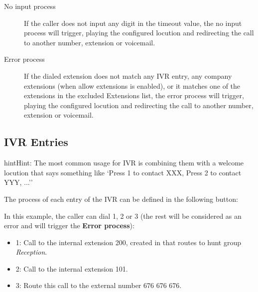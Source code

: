 \documentclass[letterpaper,10pt,english]{sphinxmanual}
\begin{document}
\begin{description}
\item[{No input process}] \leavevmode{}\label{company/ivrs:term-no-input-process}
If the caller does not input any digit in the timeout value, the
no input process will trigger, playing the configured locution and
redirecting the call to another number, extension or voicemail.

\item[{Error process}] \leavevmode{}\label{company/ivrs:term-error-process}
If the dialed extension does not match any IVR entry, any company extensions
(when allow extensions is enabled), or it matches one of the extensions in the
excluded Extensions list, the error process will trigger, playing the configured
locution and redirecting the call to another number, extension or voicemail.

\end{description}


\subsection{IVR Entries}
\label{company/ivrs:ivr-entries}
\begin{notice}{hint}{Hint:}
The most common usage for IVR is combining them with a welcome
locution that says something like `Press 1 to contact XXX, Press 2 to
contact YYY, ...''
\end{notice}

The process of each entry of the IVR can be defined in the following button:

\noindent{}

In this example, the caller can dial 1, 2 or 3 (the rest will be considered as
an error and will trigger the \textbf{Error process}):

\noindent{}
\begin{itemize}
\item {} 
1: Call to the internal extension 200, created in {\hyperref[company/huntgroups:huntgroups]{}} that routes to hunt group \emph{Reception}.

\item {} 
2: Call to the internal extension 101.

\item {} 
3: Route this call to the external number 676 676 676.

\end{itemize}
\end{document}
